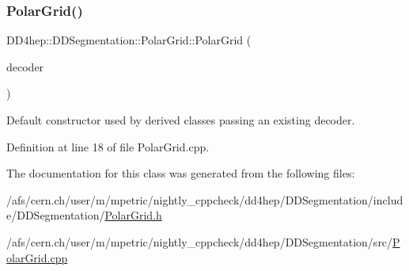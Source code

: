 \subsubsection{\texorpdfstring{Polar\+Grid()}{PolarGrid()}\hspace{0.1cm}{\footnotesize\ttfamily [2/2]}}
{\footnotesize\ttfamily D\+D4hep\+::\+D\+D\+Segmentation\+::\+Polar\+Grid\+::\+Polar\+Grid (\begin{DoxyParamCaption}\item[{\hyperlink{class_d_d4hep_1_1_d_d_segmentation_1_1_bit_field64}{Bit\+Field64} $\ast$}]{decoder }\end{DoxyParamCaption})\hspace{0.3cm}{\ttfamily [protected]}}



Default constructor used by derived classes passing an existing decoder. 



Definition at line 18 of file Polar\+Grid.\+cpp.



The documentation for this class was generated from the following files\+:\begin{DoxyCompactItemize}
\item 
/afs/cern.\+ch/user/m/mpetric/nightly\+\_\+cppcheck/dd4hep/\+D\+D\+Segmentation/include/\+D\+D\+Segmentation/\hyperlink{_polar_grid_8h}{Polar\+Grid.\+h}\item 
/afs/cern.\+ch/user/m/mpetric/nightly\+\_\+cppcheck/dd4hep/\+D\+D\+Segmentation/src/\hyperlink{_polar_grid_8cpp}{Polar\+Grid.\+cpp}\end{DoxyCompactItemize}
